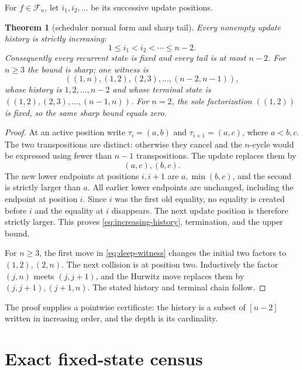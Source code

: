 \documentclass[a4paper,10pt]{amsart}
\newtheorem{theorem}{Theorem}[section]
\theoremstyle{remark}
\newcommand{\Fcal}{\mathcal F}
\begin{document}
For $f\in\Fcal_n$, let $i_1,i_2,\ldots$ be its successive update positions.

\begin{theorem}[scheduler normal form and sharp tail]\label{thm:tail}
Every nonempty update history is strictly increasing:
\begin{equation}\label{eq:increasing-history}
                  1\le i_1<i_2<\cdots\le n-2.
\end{equation}
Consequently every recurrent state is fixed and every tail is at most
$n-2$.  For $n\ge3$ the bound is sharp; one witness is
\begin{equation}\label{eq:deep-witness}
 ((1,n),(1,2),(2,3),\ldots,(n-2,n-1)),
\end{equation}
whose history is $1,2,\ldots,n-2$ and whose terminal state is
$((1,2),(2,3),\ldots,(n-1,n))$.
For $n=2$, the sole factorization $((1,2))$ is fixed, so the same sharp
bound equals zero.
\end{theorem}

\begin{proof}
At an active position write
$\tau_i=(a,b)$ and $\tau_{i+1}=(a,c)$, where $a<b,c$.  The two
transpositions are distinct: otherwise they cancel and the $n$-cycle would
be expressed using fewer than $n-1$ transpositions.  The update replaces
them by
\begin{equation}\label{eq:local-update}
                   (a,c),(b,c).
\end{equation}
The new lower endpoints at positions $i,i+1$ are
$a,\min(b,c)$, and the second is strictly larger than $a$.  All earlier
lower endpoints are unchanged, including the endpoint at position $i$.
Since $i$ was the first old equality, no equality is created before $i$ and
the equality at $i$ disappears.  The next update position is therefore
strictly larger.  This proves \eqref{eq:increasing-history}, termination, and
the upper bound.

For $n\ge3$, the first move in \eqref{eq:deep-witness} changes the initial two factors
to $(1,2),(2,n)$.  The next collision is at position two.  Inductively the
factor $(j,n)$ meets $(j,j+1)$, and the Hurwitz move replaces them by
$(j,j+1),(j+1,n)$.  The stated history and terminal chain follow.
\end{proof}

The proof supplies a pointwise certificate: the history is a subset of
$[n-2]$ written in increasing order, and the depth is its cardinality.

\section{Exact fixed-state census}
\end{document}
